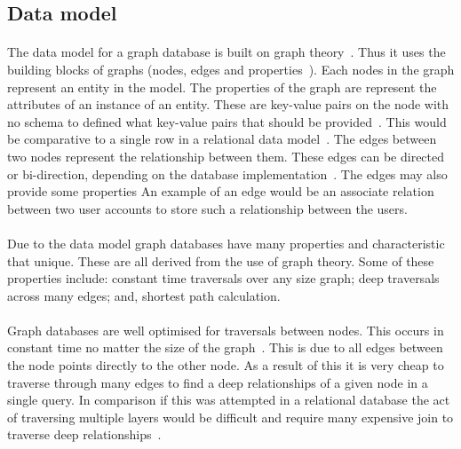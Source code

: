 \documentclass{CRPITStyle}
\renewcommand{\cite}{\citep}
\begin{document}
\subsection{Data model}

\paragraph{}
The data model for a graph database is built on graph
theory~\cite{nosql_survey,sql_nosql,graphdb}.
Thus it uses the building blocks of graphs (nodes, edges and
properties~\cite{graphdb}).
Each nodes in the graph represent an entity in the model.
The properties of the graph are represent the attributes of 
an instance of an entity.
These are key-value pairs on the node with no schema to defined what
key-value pairs that should be provided~\cite{neo4j}.
This would be comparative to a single row in a relational data
model~\cite{relational_db}.
The edges between two nodes represent the relationship between
them.
These edges can be directed or bi-direction, depending on the database
implementation~\cite{graphdb,neo4j}.
The edges may also provide some properties
An example of an edge would be an associate relation between two user accounts
to store such a relationship between the users.

\paragraph{}
Due to the data model graph databases have many properties and
characteristic that unique.
These are all derived from the use of graph theory.
Some of these properties include:
constant time traversals over any size graph;
deep traversals across many edges;
and, shortest path calculation.

\paragraph{}
Graph databases are well optimised for traversals between nodes.
This occurs in constant time no matter the size of the graph~\cite{sql_nosql}.
This is due to all edges between the node points directly
to the other node.
As a result of this it is very cheap to traverse through many
edges to find a deep relationships of a given node in a single
query.
In comparison if this was attempted in a relational database
the act of traversing multiple layers would be difficult and
require many expensive join to traverse deep
relationships~\cite{sql_nosql_gap,relational_db,neo4j}.
\end{document}
